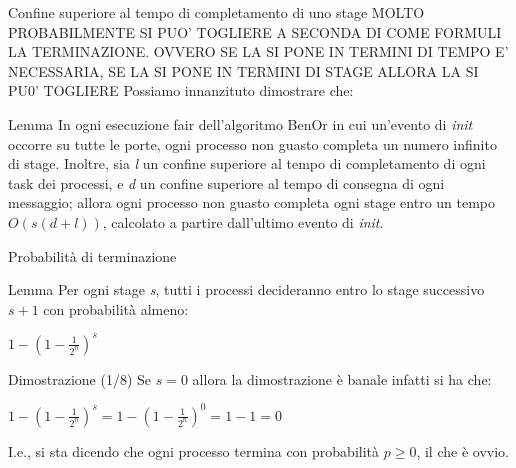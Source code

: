 \documentclass{beamer}
\begin{document}
\begin{frame}{Confine superiore al tempo di completamento di uno stage}
    MOLTO PROBABILMENTE SI PUO' TOGLIERE A SECONDA DI COME FORMULI LA TERMINAZIONE.
    OVVERO SE LA SI PONE IN TERMINI DI TEMPO E' NECESSARIA, SE LA SI PONE IN TERMINI DI STAGE ALLORA LA SI PU0' TOGLIERE
    Possiamo innanzituto dimostrare che:
    \begin{block}{Lemma}
        In ogni esecuzione fair dell'algoritmo BenOr in cui un'evento di \textit{init} occorre su tutte le porte, ogni processo non guasto completa un numero infinito di stage.\newline
        Inoltre, sia \textit{l} un confine superiore al tempo di completamento di ogni task dei processi, e \textit{d} un confine superiore al tempo di consegna di ogni messaggio; allora ogni processo non guasto completa ogni stage entro un tempo $O(s(d+l))$, calcolato a partire dall'ultimo evento di \textit{init}.
    \end{block}
\end{frame}

\begin{frame}{Probabilità di terminazione}
    \begin{block}{Lemma}
        Per ogni stage \textit{s}, tutti i processi decideranno entro lo stage successivo $s+1$ con probabilità almeno:
        \begin{center}
        \huge
            $1 - (1-\frac{1}{2^n})^s$
        \end{center}
    \end{block}
\end{frame}

\begin{frame}{Dimostrazione (1/8)}
    Se $s = 0$ allora la dimostrazione è banale infatti si ha che:
    \vspace{0.3cm}
    \begin{center}
        \Large
        $1 - (1 - \frac{1}{2^n})^s = 1 - (1 - \frac{1}{2^n})^0 = 1 - 1 = 0$
    \end{center}
    \normalsize
    \vspace{0.3cm}
    I.e., si sta dicendo che ogni processo termina con probabilità $p \geq 0$, il che è ovvio.
\end{frame}
\end{document}
